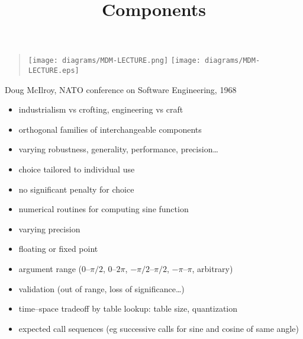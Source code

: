 \documentclass{sepslide-soa-faked} %
\title{Components}
\begin{document}
\begin{slide}
  \Title
\end{slide}

\begin{slide}
  \Contents
\end{slide}

\begin{slide}
\begin{quote}
\ifpdf
\texttt{[image: diagrams/MDM-LECTURE.png]}%
\else
\texttt{[image: diagrams/MDM-LECTURE.eps]}%
\fi
\end{quote}
Doug McIlroy, NATO conference on Software Engineering, 1968
\end{slide}

\begin{slide}
\begin{itemize}
\item industrialism vs crofting, engineering vs craft
\item orthogonal families of interchangeable components
\item varying robustness, generality, performance, precision\ldots
\item choice tailored to individual use
\item no significant penalty for choice
\end{itemize}
\end{slide}

\begin{slide}
\begin{itemize}
\item numerical routines for computing sine function
\item varying precision
\item floating or fixed point
\item argument range ($0$--$\pi/2$, $0$--$2\pi$, $-\pi/2$--$\pi/2$, $-\pi$--$\pi$, arbitrary)
\item validation (out of range, loss of significance\ldots)
\item time--space tradeoff by table lookup: table size, quantization
\item expected call sequences (eg successive calls for sine and cosine of same angle)
\end{itemize}
\end{slide}
\end{document}
